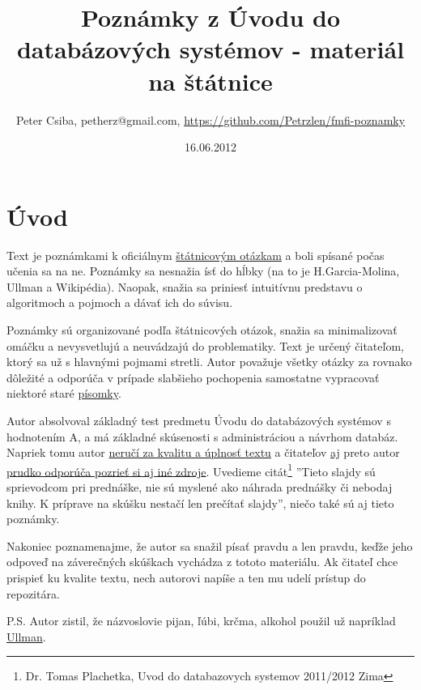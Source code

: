 \documentclass[10pt,a4paper]{article}
\title{Poznámky z Úvodu do databázových systémov - materiál na štátnice}
\date{16.06.2012}
\author{Peter Csiba, petherz@gmail.com, \url{https://github.com/Petrzlen/fmfi-poznamky}}
\begin{document}
\maketitle
\tableofcontents

\clearpage

\section*{Úvod}   

Text je poznámkami k oficiálnym \href{http://new.dcs.fmph.uniba.sk/index.php/Studium/Bakalarske/StatneSkusky}{štátnicovým otázkam} a boli spísané počas učenia sa na ne.
Poznámky sa nesnažia ísť do hĺbky (na to je H.Garcia-Molina, Ullman a Wikipédia).
Naopak, snažia sa priniesť intuitívnu predstavu o algoritmoch a pojmoch a dávať ich do súvisu.

Poznámky sú organizované podľa štátnicových otázok, snažia sa minimalizovať omáčku a nevysvetlujú a neuvádzajú do problematiky. Text je určený čitateľom, ktorý sa už s hlavnými pojmami stretli.
Autor považuje všetky otázky za rovnako dôležité a odporúča v prípade slabšieho pochopenia samostatne vypracovať niektoré staré \href{http://www.dcs.fmph.uniba.sk/~plachetk/TEACHING/DB2011/index.html}{písomky}.

Autor absolvoval základný test predmetu Úvodu do databázových systémov s hodnotením A, a má základné skúsenosti s administráciou a návrhom databáz. Napriek tomu autor \underline{neručí za kvalitu a úplnosť textu} a čitateľov \underline{aj} preto autor \underline{prudko odporúča pozrieť si aj iné zdroje}. Uvedieme citát\footnote{Dr. Tomas Plachetka, Uvod do databazovych systemov 2011/2012 Zima} ''Tieto slajdy sú sprievodcom pri prednáške, nie sú myslené ako náhrada
prednášky či nebodaj knihy. K príprave na skúšku nestačí len prečítať slajdy'', niečo také sú aj tieto poznámky.  

Nakoniec poznamenajme, že autor sa snažil písať pravdu a len pravdu, keďže jeho odpoveď na záverečných skúškach vychádza z tototo materiálu.
Ak čitateľ chce prispieť ku kvalite textu, nech autorovi napíše a ten mu udelí prístup do repozitára.

P.S. Autor zistil, že názvoslovie pijan, ľúbi, krčma, alkohol použil už napríklad \href{http://csip.sk/uploads/ullman.pdf}{Ullman}.

\end{document}
